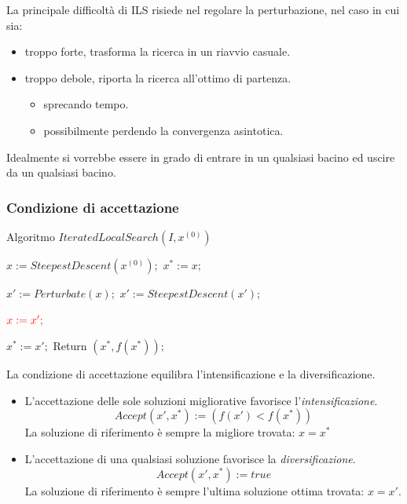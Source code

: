 \documentclass{article}
\begin{document}
La principale difficoltà di ILS risiede nel regolare la perturbazione, nel caso in cui sia:
\begin{itemize}
    \item troppo forte, trasforma la ricerca in un riavvio casuale.
    \item troppo debole, riporta la ricerca all'ottimo di partenza.
    \begin{itemize}
        \item sprecando tempo.
        \item possibilmente perdendo la convergenza asintotica.
    \end{itemize}
\end{itemize}
Idealmente si vorrebbe essere in grado di entrare in un qualsiasi bacino ed uscire da
un qualsiasi bacino.

\subsubsection{Condizione di accettazione}

\begin{algorithm}[H]
    \caption{Algoritmo $IteratedLocalSearch(I,x^{(0)})$}
    \label{alg:ils}
    \begin{algorithmic}
        \State $x:=SteepestDescent(x^{(0)});$
        \State $x^*:=x;$

            \State $x':=Perturbate(x);$
            \State $x':=SteepestDescent(x');$

                \State $\begingroup\color{red} x:=x';\endgroup$
            \EndIf

                \State $x^*:=x';$
            \EndIf
        \EndFor
        \State Return $(x^*,f(x^*));$

    \end{algorithmic}
\end{algorithm}

La condizione di accettazione equilibra l'intensificazione e la diversificazione.
\begin{itemize}
    \item L'accettazione delle sole soluzioni migliorative favorisce l'\textit{intensificazione}.
    $$Accept(x',x^*):=(f(x')<f(x^*))$$
    La soluzione di riferimento è sempre la migliore trovata: $x=x^*$
    \item L'accettazione di una qualsiasi soluzione favorisce la \textit{diversificazione}.
    $$Accept(x',x^*):=true$$
    La soluzione di riferimento è sempre l'ultima soluzione ottima trovata: $x=x'$.
\end{itemize}
\end{document}
